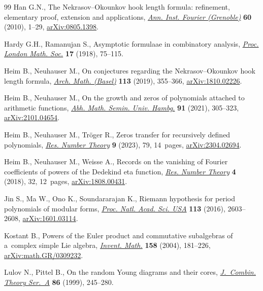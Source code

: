 \documentclass[pdftex]{sigma}
\numberwithin{equation}{section}
\begin{document}
\begin{thebibliography}{99}
Han G.N., The {N}ekrasov--{O}kounkov hook length formula: refinement,
 elementary proof, extension and applications, \href{https://doi.org/10.5802/aif.2515}{\textit{Ann. Inst. Fourier
 (Grenoble)}} \textbf{60} (2010), 1--29, \href{https://arxiv.org/abs/0805.1398}{arXiv:0805.1398}.

Hardy G.H., Ramanujan S., Asymptotic formulaae in combinatory analysis,
 \href{https://doi.org/10.1112/plms/s2-17.1.75}{\textit{Proc. London Math. Soc.}} \textbf{17} (1918), 75--115.

Heim B., Neuhauser M., On conjectures regarding the {N}ekrasov--{O}kounkov hook
 length formula, \href{https://doi.org/10.1007/s00013-019-01335-4}{\textit{Arch. Math. (Basel)}} \textbf{113} (2019), 355--366,
 \href{https://arxiv.org/abs/1810.02226}{arXiv:1810.02226}.

Heim B., Neuhauser M., On the growth and zeros of polynomials attached to
 arithmetic functions, \href{https://doi.org/10.1007/s12188-021-00241-3}{\textit{Abh. Math. Semin. Univ. Hambg.}} \textbf{91}
 (2021), 305--323, \href{https://arxiv.org/abs/2101.04654}{arXiv:2101.04654}.

Heim B., Neuhauser M., Tr\"oger R., Zeros transfer for recursively defined
 polynomials, \href{https://doi.org/10.1007/s40993-023-00480-8}{\textit{Res. Number Theory}} \textbf{9} (2023), 79, 14~pages,
 \href{https://arxiv.org/abs/2304.02694}{arXiv:2304.02694}.

Heim B., Neuhauser M., Weisse A., Records on the vanishing of {F}ourier
 coefficients of powers of the {D}edekind eta function, \href{https://doi.org/10.1007/s40993-018-0125-y}{\textit{Res. Number
 Theory}} \textbf{4} (2018), 32, 12~pages, \href{https://arxiv.org/abs/1808.00431}{arXiv:1808.00431}.

Jin S., Ma W., Ono K., Soundararajan K., Riemann hypothesis for period
 polynomials of modular forms, \href{https://doi.org/10.1073/pnas.1600569113}{\textit{Proc. Natl. Acad. Sci. USA}}
 \textbf{113} (2016), 2603--2608, \href{https://arxiv.org/abs/1601.03114}{arXiv:1601.03114}.

Kostant B., Powers of the {E}uler product and commutative subalgebras of
 a~complex simple {L}ie algebra, \href{https://doi.org/10.1007/s00222-004-0370-7}{\textit{Invent. Math.}} \textbf{158} (2004),
 181--226, \href{https://arxiv.org/abs/math.GR/0309232}{arXiv:math.GR/0309232}.

Lulov N., Pittel B., On the random {Y}oung diagrams and their cores,
 \href{https://doi.org/10.1006/jcta.1998.2939}{\textit{J.~Combin. Theory Ser.~A}} \textbf{86} (1999), 245--280.


\end{thebibliography}
\end{document}

